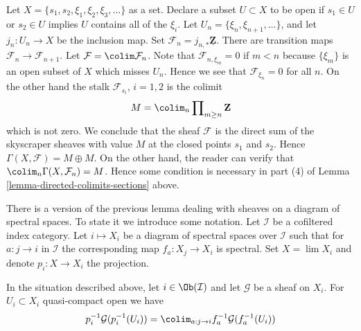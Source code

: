 \begin{example}
\label{example-conditions-needed-colimit}
Let $X = \{s_1, s_2, \xi_1, \xi_2, \xi_3, \ldots\}$ as a set.
Declare a subset $U \subset X$ to be open
if $s_1 \in U$ or $s_2 \in U$ implies $U$ contains all of the
$\xi_i$. Let $U_n = \{\xi_n, \xi_{n + 1}, \ldots\}$, and
let $j_n : U_n \to X$ be the inclusion map.
Set $\mathcal{F}_n = j_{n, *}\underline{\mathbf{Z}}$.
There are transition maps $\mathcal{F}_n \to \mathcal{F}_{n + 1}$.
Let $\mathcal{F} = \colim \mathcal{F}_n$.
Note that $\mathcal{F}_{n, \xi_m} = 0$ if $m < n$
because $\{\xi_m\}$ is an open subset of $X$ which misses $U_n$.
Hence we see that $\mathcal{F}_{\xi_n} = 0$ for all $n$.
On the other hand the stalk $\mathcal{F}_{s_i}$, $i = 1, 2$
is the colimit
$$
M = \colim_n \prod\nolimits_{m \geq n} \mathbf{Z}
$$
which is not zero. We conclude that the sheaf
$\mathcal{F}$ is the direct sum of the
skyscraper sheaves with value $M$ at the closed points
$s_1$ and $s_2$. Hence $\Gamma(X, \mathcal{F}) = M \oplus M$.
On the other hand, the reader can verify that
$\colim_n \Gamma(X, \mathcal{F}_n) = M$.
Hence some condition is necessary in part (4)
of Lemma \ref{lemma-directed-colimits-sections} above.
\end{example}

\noindent
There is a version of the previous lemma dealing with sheaves on a diagram
of spectral spaces. To state it we introduce some notation.
Let $\mathcal{I}$ be a cofiltered index category.
Let $i \mapsto X_i$ be a diagram of spectral spaces over $\mathcal{I}$
such that for $a : j \to i$ in $\mathcal{I}$ the corresponding map
$f_a : X_j \to X_i$ is spectral. Set $X = \lim X_i$ and denote
$p_i : X \to X_i$ the projection.

\begin{lemma}
\label{lemma-compute-pullback-to-limit}
In the situation described above, let $i \in \Ob(\mathcal{I})$ and let
$\mathcal{G}$ be a sheaf on $X_i$. For $U_i \subset X_i$
quasi-compact open we have
$$
p_i^{-1}\mathcal{G}(p_i^{-1}(U_i)) =
\colim_{a : j \to i} f_a^{-1}\mathcal{G}(f_a^{-1}(U_i))
$$
\end{lemma}

